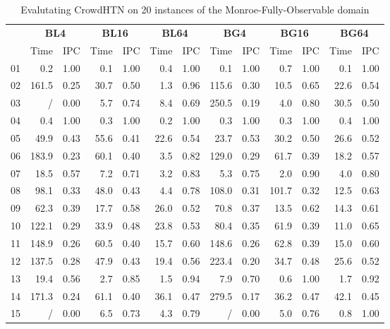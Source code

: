 \begin{table}
	\caption{Evalutating CrowdHTN on 20 instances of the Monroe-Fully-Observable domain}
	\label{table: eval scalability}
	\centering
	\begin{tabular}{|l|rc|rc|rc|rc|rc|rc|}
		\hline
		& \multicolumn{2}{c|}{\textbf{BL4}} & \multicolumn{2}{c|}{\textbf{BL16}} & \multicolumn{2}{c|}{\textbf{BL64}} & \multicolumn{2}{c|}{\textbf{BG4}} & \multicolumn{2}{c|}{\textbf{BG16}} & \multicolumn{2}{c|}{\textbf{BG64}}\\
		& Time & IPC & Time & IPC & Time & IPC & Time & IPC & Time & IPC & Time & IPC\\
		\hline
		01 & 0.2 & 1.00 & 0.1 & 1.00 & 0.4 & 1.00 & 0.1 & 1.00 & 0.7 & 1.00 & 0.1 & 1.00\\
		02 & 161.5 & 0.25 & 30.7 & 0.50 & 1.3 & 0.96 & 115.6 & 0.30 & 10.5 & 0.65 & 22.6 & 0.54\\
		03 & / & 0.00 & 5.7 & 0.74 & 8.4 & 0.69 & 250.5 & 0.19 & 4.0 & 0.80 & 30.5 & 0.50\\
		04 & 0.4 & 1.00 & 0.3 & 1.00 & 0.2 & 1.00 & 0.3 & 1.00 & 0.3 & 1.00 & 0.4 & 1.00\\
		05 & 49.9 & 0.43 & 55.6 & 0.41 & 22.6 & 0.54 & 23.7 & 0.53 & 30.2 & 0.50 & 26.6 & 0.52\\
		06 & 183.9 & 0.23 & 60.1 & 0.40 & 3.5 & 0.82 & 129.0 & 0.29 & 61.7 & 0.39 & 18.2 & 0.57\\
		07 & 18.5 & 0.57 & 7.2 & 0.71 & 3.2 & 0.83 & 5.3 & 0.75 & 2.0 & 0.90 & 4.0 & 0.80\\
		08 & 98.1 & 0.33 & 48.0 & 0.43 & 4.4 & 0.78 & 108.0 & 0.31 & 101.7 & 0.32 & 12.5 & 0.63\\
		09 & 62.3 & 0.39 & 17.7 & 0.58 & 26.0 & 0.52 & 70.8 & 0.37 & 13.5 & 0.62 & 14.3 & 0.61\\
		10 & 122.1 & 0.29 & 33.9 & 0.48 & 23.8 & 0.53 & 80.4 & 0.35 & 61.9 & 0.39 & 11.0 & 0.65\\
		11 & 148.9 & 0.26 & 60.5 & 0.40 & 15.7 & 0.60 & 148.6 & 0.26 & 62.8 & 0.39 & 15.0 & 0.60\\
		12 & 137.5 & 0.28 & 47.9 & 0.43 & 19.4 & 0.56 & 223.4 & 0.20 & 34.7 & 0.48 & 25.6 & 0.52\\
		13 & 19.4 & 0.56 & 2.7 & 0.85 & 1.5 & 0.94 & 7.9 & 0.70 & 0.6 & 1.00 & 1.7 & 0.92\\
		14 & 171.3 & 0.24 & 61.1 & 0.40 & 36.1 & 0.47 & 279.5 & 0.17 & 36.2 & 0.47 & 42.1 & 0.45\\
		15 & / & 0.00 & 6.5 & 0.73 & 4.3 & 0.79 & / & 0.00 & 5.0 & 0.76 & 0.8 & 1.00\\

\end{tabular}
\end{table}
